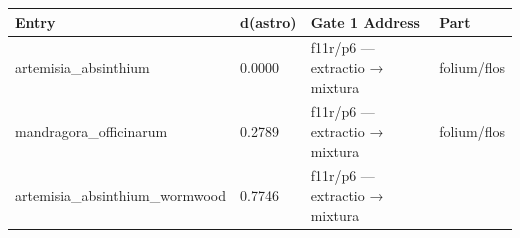 \documentclass[12pt,a4paper]{article}
\begin{document}
\begin{longtable}[]{@{}llll@{}}
\toprule
\begin{minipage}[b]{0.22\columnwidth}\raggedright
Entry\strut
\end{minipage} & \begin{minipage}[b]{0.22\columnwidth}\raggedright
d(astro)\strut
\end{minipage} & \begin{minipage}[b]{0.22\columnwidth}\raggedright
Gate 1 Address\strut
\end{minipage} & \begin{minipage}[b]{0.22\columnwidth}\raggedright
Part\strut
\end{minipage}\tabularnewline
\midrule
\endhead
\begin{minipage}[t]{0.22\columnwidth}\raggedright
artemisia\_absinthium\strut
\end{minipage} & \begin{minipage}[t]{0.22\columnwidth}\raggedright
0.0000\strut
\end{minipage} & \begin{minipage}[t]{0.22\columnwidth}\raggedright
f11r/p6 --- extractio → mixtura\strut
\end{minipage} & \begin{minipage}[t]{0.22\columnwidth}\raggedright
folium/flos\strut
\end{minipage}\tabularnewline
\begin{minipage}[t]{0.22\columnwidth}\raggedright
mandragora\_officinarum\strut
\end{minipage} & \begin{minipage}[t]{0.22\columnwidth}\raggedright
0.2789\strut
\end{minipage} & \begin{minipage}[t]{0.22\columnwidth}\raggedright
f11r/p6 --- extractio → mixtura\strut
\end{minipage} & \begin{minipage}[t]{0.22\columnwidth}\raggedright
folium/flos\strut
\end{minipage}\tabularnewline
\begin{minipage}[t]{0.22\columnwidth}\raggedright
artemisia\_absinthium\_wormwood\strut
\end{minipage} & \begin{minipage}[t]{0.22\columnwidth}\raggedright
0.7746\strut
\end{minipage} & \begin{minipage}[t]{0.22\columnwidth}\raggedright
f11r/p6 --- extractio → mixtura\strut

\end{minipage}
\end{longtable}
\end{document}
